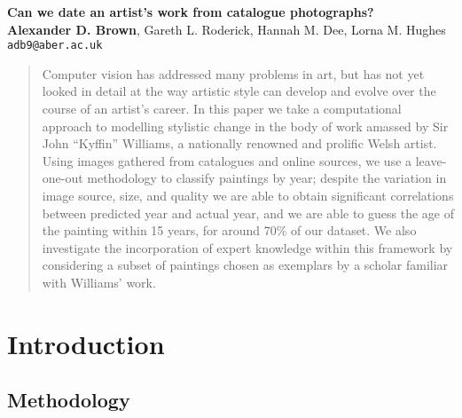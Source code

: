 \documentclass[a3,portrait]{template/a0poster}
\begin{document}
\begin{minipage}[b]{\linewidth}
\veryHuge \color{NavyBlue} \textbf{Can we date an artist's work from catalogue photographs?}
\color{Black}\\ %
\huge \textbf{Alexander D. Brown}, Gareth L. Roderick, Hannah M. Dee, Lorna M.
Hughes\\[0.5cm] %
\Large \texttt{adb9@aber.ac.uk}\\
\end{minipage}
\vspace{1cm} %

\begin{multicols}{2}

\begin{abstract}
Computer vision has addressed many problems in art, but has not yet looked in
detail at the way artistic style can develop and evolve over the course of an
artist's career. In this paper we take a computational approach to modelling
stylistic change in the body of work amassed by Sir John “Kyffin” Williams, a
nationally renowned and prolific Welsh artist. Using images gathered from
catalogues and online sources, we use a leave-one-out methodology to classify
paintings by year; despite the variation in image source, size, and quality we
are able to obtain significant correlations between predicted year and actual
year, and we are able to guess the age of the painting within 15 years, for
around 70\% of our dataset. We also investigate the incorporation of expert
knowledge within this framework by considering a subset of paintings chosen as
exemplars by a scholar familiar with Williams' work.
\end{abstract}

\section*{Introduction}

\end{multicols}

\newpage

\begin{multicols}{2}
\section*{Methodology}
\end{multicols}
\end{document}
